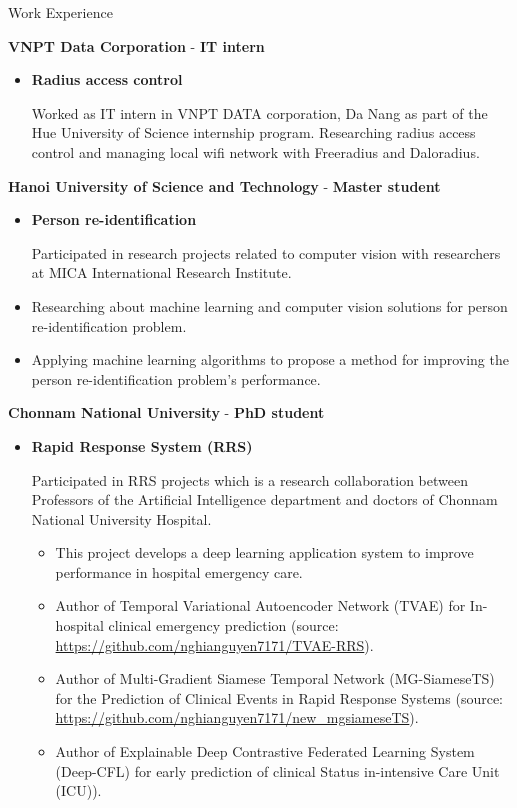 \begin{rubric}{Work Experience}

\entry*[08/2017 -- 02/2018]%
        \textbf{VNPT Data Corporation} - \textbf{IT intern}        
	\begin{itemize}
        \item \textbf{Radius access control}\par
	Worked as IT intern in VNPT DATA corporation, Da Nang as part of the Hue University of Science internship program. Researching radius access control and managing local wifi network with Freeradius and Daloradius.
   \end{itemize}

\entry*[09/2018 -- 08/2020]%
        \textbf{Hanoi University of Science and Technology} - \textbf{Master student}        
	\begin{itemize}
        \item \textbf{Person re-identification}\par
	Participated in research projects related to computer vision with researchers at
MICA International Research Institute.
        \item Researching about machine learning and computer vision solutions for person
re-identification problem.
        \item Applying machine learning algorithms to propose a method for improving the
person re-identification problem's performance.
   \end{itemize}

\entry*[03/2021 -- 08/2024]%
        \textbf{Chonnam National University} - \textbf{PhD student}        
	\begin{itemize}
        \item \textbf{Rapid Response System (RRS)}\par
	Participated in RRS projects which is a research collaboration between Professors of the Artificial Intelligence department and doctors of Chonnam National University Hospital.     \begin{itemize}
	    \item This project develops a deep learning application system to improve performance in hospital emergency care.
            \item Author of Temporal Variational Autoencoder Network (TVAE) for In-hospital clinical emergency prediction (source: \url{https://github.com/nghianguyen7171/TVAE-RRS}). 
            \item Author of Multi-Gradient Siamese Temporal Network (MG-SiameseTS) for the Prediction of Clinical Events in Rapid Response Systems (source: \url{https://github.com/nghianguyen7171/new_mgsiameseTS}). 
            \item Author of Explainable Deep Contrastive Federated Learning System (Deep-CFL) for early prediction of clinical Status in-intensive Care Unit (ICU)).
	\end{itemize}
        

\end{itemize}
\end{rubric}
